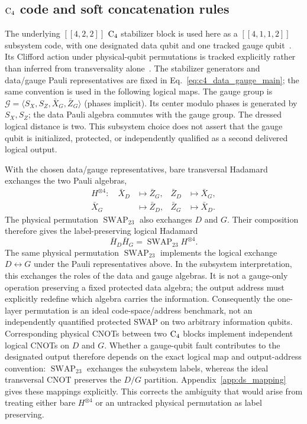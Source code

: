 \documentclass[aps,
prx,
superscriptaddress,
reprint,
longbibliography,
floatfix]{revtex4-2}
\begin{document}
\subsection{${\rm C_4}$ code and soft concatenation rules}\label{sec:concat_c4_stabilizers}
The underlying $[[4,2,2]]$ ${\rm C_4}$ stabilizer block is used here as a $[[4,1,1,2]]$ subsystem code, with one designated data qubit and one tracked gauge qubit~\cite{Knill2005,AGP2008Postselection}. Its Clifford action under physical-qubit permutations is tracked explicitly rather than inferred from transversality alone~\cite{Sayginel2025C4Clifford}. The stabilizer generators and data/gauge Pauli representatives are fixed in Eq.~\eqref{eq:c4_data_gauge_main}; the same convention is used in the following logical maps.
The gauge group is $\mathcal G=\langle S_X,S_Z,\bar X_G,\bar Z_G\rangle$ (phases implicit). Its center modulo phases is generated by $S_X,S_Z$; the data Pauli algebra commutes with the gauge group. The dressed logical distance is two. This subsystem choice does not assert that the gauge qubit is initialized, protected, or independently qualified as a second delivered logical output.

With the chosen data/gauge representatives, bare transversal Hadamard exchanges the two Pauli algebras,
\begin{align}
H^{\otimes4}:\quad
\bar X_D&\mapsto\bar Z_G, & \bar Z_D&\mapsto\bar X_G,\\
\bar X_G&\mapsto\bar Z_D, & \bar Z_G&\mapsto\bar X_D.
\end{align}
The physical permutation $\operatorname{SWAP}_{23}$ also exchanges $D$ and $G$. Their composition therefore gives the label-preserving logical Hadamard
\begin{equation}
\bar H_D\bar H_G=\operatorname{SWAP}_{23}H^{\otimes4}.
\label{eq:label_preserving_H}
\end{equation}
The same physical permutation $\operatorname{SWAP}_{23}$ implements the logical exchange $D\leftrightarrow G$ under the Pauli representatives above.
In the subsystem interpretation, this exchanges the roles of the data and gauge algebras. It is not a gauge-only operation preserving a fixed protected data algebra; the output address must explicitly redefine which algebra carries the information. Consequently the one-layer permutation is an ideal code-space/address benchmark, not an independently quantified protected SWAP on two arbitrary information qubits. Corresponding physical CNOTs between two ${\rm C_4}$ blocks implement independent logical CNOTs on $D$ and $G$. Whether a gauge-qubit fault contributes to the designated output therefore depends on the exact logical map and output-address convention: $\operatorname{SWAP}_{23}$ exchanges the subsystem labels, whereas the ideal transversal CNOT preserves the $D/G$ partition. Appendix~\ref{app:ds_mapping} gives these mappings explicitly. This corrects the ambiguity that would arise from treating either bare $H^{\otimes4}$ or an untracked physical permutation as label preserving.
\end{document}
